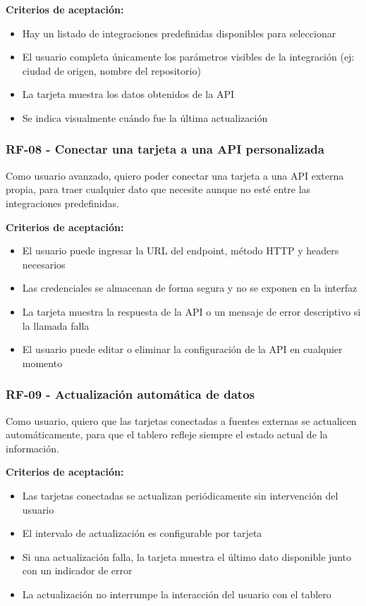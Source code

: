 \textbf{Criterios de aceptación:}
\begin{itemize}
  \item Hay un listado de integraciones predefinidas disponibles para seleccionar
  \item El usuario completa únicamente los parámetros visibles de la integración (ej: ciudad de origen, nombre del repositorio)
  \item La tarjeta muestra los datos obtenidos de la API
  \item Se indica visualmente cuándo fue la última actualización
\end{itemize}

\subsubsection*{RF-08 - Conectar una tarjeta a una API personalizada}
Como usuario avanzado, quiero poder conectar una tarjeta a una API externa propia, para traer cualquier dato que necesite aunque no esté entre las integraciones predefinidas.

\textbf{Criterios de aceptación:}
\begin{itemize}
  \item El usuario puede ingresar la URL del endpoint, método HTTP y headers necesarios
  \item Las credenciales se almacenan de forma segura y no se exponen en la interfaz
  \item La tarjeta muestra la respuesta de la API o un mensaje de error descriptivo si la llamada falla
  \item El usuario puede editar o eliminar la configuración de la API en cualquier momento
\end{itemize}

\subsubsection*{RF-09 - Actualización automática de datos}
Como usuario, quiero que las tarjetas conectadas a fuentes externas se actualicen automáticamente, para que el tablero refleje siempre el estado actual de la información.

\textbf{Criterios de aceptación:}
\begin{itemize}
  \item Las tarjetas conectadas se actualizan periódicamente sin intervención del usuario
  \item El intervalo de actualización es configurable por tarjeta
  \item Si una actualización falla, la tarjeta muestra el último dato disponible junto con un indicador de error
  \item La actualización no interrumpe la interacción del usuario con el tablero
\end{itemize}

